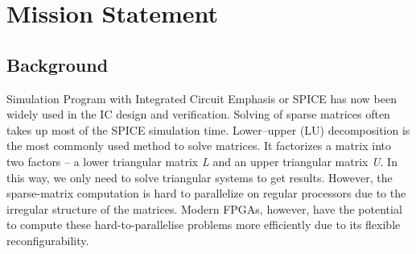 %
%
%




%


\chapter*{Mission Statement}\label{mission_statement}

\section*{Background}
Simulation Program with Integrated Circuit Emphasis or SPICE has now been widely used in the IC design and verification. Solving of sparse matrices often takes up most of the SPICE simulation time. Lower–upper (LU) decomposition is the most commonly used method to solve matrices. It factorizes a matrix into two factors – a lower triangular matrix \emph{L} and an upper triangular matrix \emph{U}. In this way, we only need to solve triangular systems to get results. However, the sparse-matrix computation is hard to parallelize on regular processors due to the irregular structure of the matrices. Modern FPGAs, however, have the potential to compute these hard-to-parallelise problems more efficiently due to its flexible reconfigurability.

